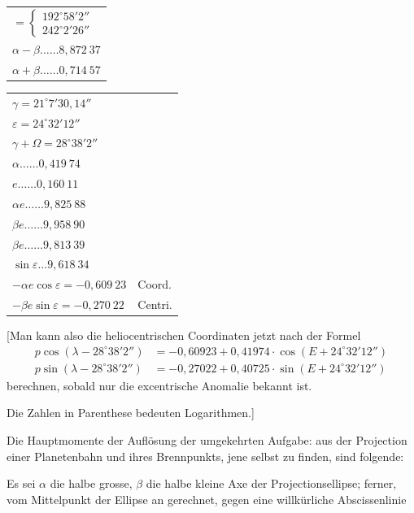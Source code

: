 \documentclass[12pt,a4paper]{article}
\begin{document}
\begin{center}
\begin{tabular}{l}
$= \begin{cases} 192^\circ 58' 2'' \\ 242^\circ 2' 26'' \end{cases}$ \\
$\alpha - \beta \ldots\ldots 8{,}872\ 37$ \\
$\alpha + \beta \ldots\ldots 0{,}714\ 57$
\end{tabular}
\end{center}

\begin{center}
\begin{tabular}{ll}
$\gamma = 21^\circ 7' 30{,}14''$ & \\
$\varepsilon = 24^\circ 32' 12''$ & \\
$\gamma + \Omega = 28^\circ 38' 2''$ & \\
$\alpha \ldots\ldots 0{,}419\ 74$ & \\
$e \ldots\ldots 0{,}160\ 11$ & \\
$\alpha e \ldots\ldots 9{,}825\ 88$ & \\
$\beta e \ldots\ldots 9{,}958\ 90$ & \\
$\beta e \ldots\ldots 9{,}813\ 39$ & \\
$\sin\varepsilon \ldots 9{,}618\ 34$ & \\
$-\alpha e\cos\varepsilon = -0{,}609\ 23$ & Coord. \\
$-\beta e\sin\varepsilon = -0{,}270\ 22$ & Centri.
\end{tabular}
\end{center}

[Man kann also die heliocentrischen Coordinaten jetzt nach der Formel
\begin{align*}
p\cos(\lambda - 28^\circ 38' 2'') &= -0{,}60923 + 0{,}41974 \cdot \cos(E + 24^\circ 32' 12'') \\
p\sin(\lambda - 28^\circ 38' 2'') &= -0{,}27022 + 0{,}40725 \cdot \sin(E + 24^\circ 32' 12'')
\end{align*}
berechnen, sobald nur die excentrische Anomalie bekannt ist.

Die Zahlen in Parenthese bedeuten Logarithmen.]

Die Hauptmomente der Aufl\"osung der umgekehrten Aufgabe: aus der
Projection einer Planetenbahn und ihres Brennpunkts, jene selbst zu finden,
sind folgende:

\newpage

Es sei $\alpha$ die halbe grosse, $\beta$ die halbe kleine Axe der Projectionsellipse;
ferner, vom Mittelpunkt der Ellipse an gerechnet, gegen eine willk\"urliche
Abscissenlinie
\end{document}
